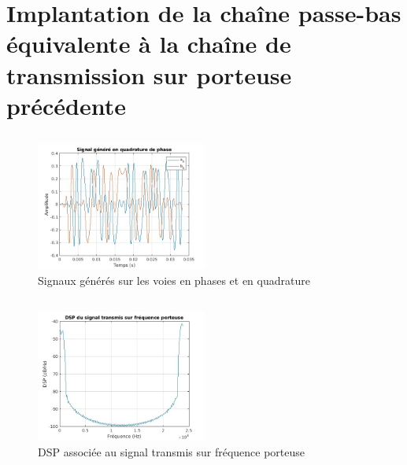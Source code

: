 \documentclass[a4paper, 12pt]{article}
\begin{document}
\subsection{}

\clearpage
\section{Implantation de la chaîne passe-bas équivalente à la chaîne de transmission sur porteuse précédente}

\subsection{}
\begin{figure}[H]
    \centering
    \includegraphics[width=0.5\textwidth]{graphics/2-1.jpg}
    \caption{Signaux générés sur les voies en phases et en quadrature}
    \label{fig:mon_etiquette}
\end{figure}

\subsection{}
\begin{figure}[H]
    \centering
    \includegraphics[width=0.5\textwidth]{graphics/2-2.jpg}
    \caption{DSP associée au signal transmis sur fréquence porteuse}
    \label{fig:mon_etiquette}
\end{figure}

\subsection{}
\end{document}
